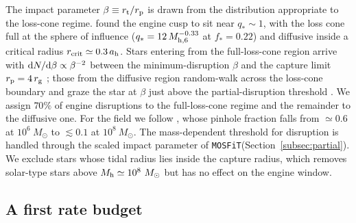 \documentclass[twocolumn,pdftex]{aastex701}
\newcommand{\msun}{M_{\odot}\xspace}
\newcommand{\mhsix}{M_{\rm h,6}\xspace}
\newcommand{\mosfit}{{\tt MOSFiT}\xspace}
\begin{document}
The impact parameter $\beta \equiv r_{\rm t}/r_{\rm p}$ is drawn from the distribution appropriate to the loss-cone regime. \citet{Guillochon:2026a} found the engine cusp to sit near $q_{\ast} \sim 1$, with the loss cone full at the sphere of influence ($q_{\ast} = 12\, \mhsix^{-0.33}$ at $f_{\ast} = 0.22$) and diffusive inside a critical radius $r_{\rm crit} \simeq 0.3\, a_{\rm h}$. Stars entering from the full-loss-cone region arrive with ${\rm d}N/{\rm d}\beta \propto \beta^{-2}$ between the minimum-disruption $\beta$ and the capture limit $r_{\rm p} = 4\, r_{\rm g}$ \citep{Hills:1975a,Kesden:2012a}; those from the diffusive region random-walk across the loss-cone boundary and graze the star at $\beta$ just above the partial-disruption threshold \citep{Stone:2016a}. We assign $70\%$ of engine disruptions to the full-loss-cone regime and the remainder to the diffusive one. For the field we follow \citet{Stone:2016a}, whose pinhole fraction falls from $\simeq 0.6$ at $10^{6}~\msun$ to $\lesssim 0.1$ at $10^{8}~\msun$. The mass-dependent threshold for disruption is handled through the scaled impact parameter of \mosfit (Section~\ref{subsec:partial}). We exclude stars whose tidal radius lies inside the capture radius, which removes solar-type stars above $M_{\rm h} \simeq 10^{8}~\msun$ but has no effect on the engine window.

\subsection{A first rate budget}\label{subsec:budget}
\end{document}
